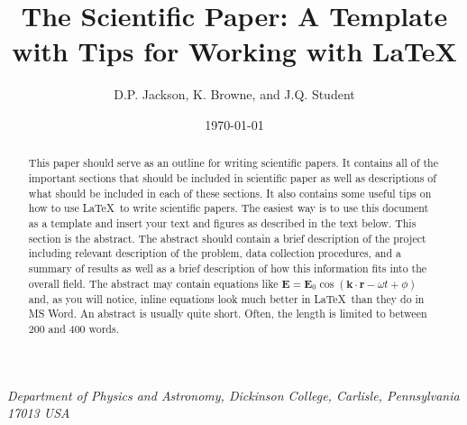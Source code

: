\documentclass[pre,floats,aps,amsmath,amssymb]{article}
\begin{document}
\title{The Scientific Paper: A Template with Tips for Working with
\LaTeX}
\author{D.P. Jackson, K. Browne, and J.Q. Student}
\textit{Department of Physics and Astronomy, Dickinson
College, Carlisle, Pennsylvania  17013  USA}
\date{\today}

\begin{abstract}
This paper should serve as an outline for writing scientific papers.
It contains all of the important sections that should be included in
scientific paper as well as descriptions of what should be included in
each of these sections. It also contains some useful tips on how to
use \LaTeX\ to write scientific papers.  The easiest way is to use
this document as a template and insert your text and figures as
described in the text below. This section is the abstract.  The
abstract should contain a brief description of the project including
relevant description of the problem, data collection procedures, and a
summary of results as well as a brief description of how this
information fits into the overall field.  The abstract may contain
equations like $\textbf{E}=\textbf{E}_0\cos
(\textbf{k}\cdot\textbf{r}-\omega t+\phi)$ and, as you will notice,
inline equations look much better in \LaTeX\ than they do in MS Word.
An abstract is usually quite short. Often, the length is limited to
between 200 and 400 words.
\end{abstract}

\maketitle
\end{document}
